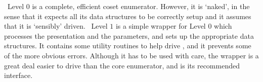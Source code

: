 
%
%

\ace\ Level $0$ is a complete, efficient coset enumerator.
However, it is `naked'\kern-1.5pt, in the sense that it expects all its 
  data structures to be correctly setup and it assumes that it is
  `sensibly' driven.
\ace\ Level $1$ is a simple wrapper for Level $0$ which processes the 
  presentation and the parameters, and sets up the appropriate data
  structures.
It contains some utility routines to help drive \ace, and it prevents some
  of the more obvious errors.
Although it has to be used with care, the wrapper is a great deal easier to
  drive than the core enumerator, and is its recommended interface.

